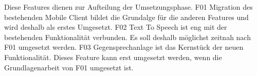 Diese Features dienen zur Aufteilung der Umsetzungsphase.
F01 Migration des bestehenden Mobile Client bildet die Grundalge für die anderen Features und wird deshalb als erstes Umgesetzt.
F02 Text To Speech ist eng mit der bestehenden Funktionalität verbunden.
Es soll deshalb möglichst zeitnah nach F01 umgesetzt werden.
F03 Gegensprechanlage ist das Kernstück der neuen Funktionalität.
Dieses Feature kann erst umgesetzt werden, wenn die Grundlagenarbeit von F01 umgesetzt ist.


\clearpage
